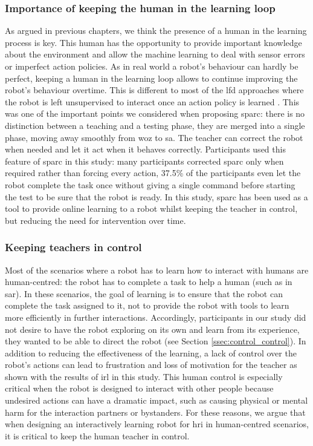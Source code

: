\subsubsection{Importance of keeping the human in the learning loop}

As argued in previous chapters, we think the presence of a human in the learning process is key. This human has the opportunity to provide important knowledge about the environment and allow the machine learning to deal with sensor errors or imperfect action policies. As in real world a robot's behaviour can hardly be perfect, keeping a human in the learning loop allows to continue improving the robot's behaviour overtime. This is different to most of the \gls{lfd} approaches where the robot is left unsupervised to interact once an action policy is learned \citep{argall2009survey,sequeira2016discovering}. This was one of the important points we considered when proposing \gls{sparc}: there is no distinction between a teaching and a testing phase, they are merged into a single phase, moving away smoothly from \gls{woz} to \gls{sa}. The teacher can correct the robot when needed and let it act when it behaves correctly. Participants used this feature of \gls{sparc} in this study: many participants corrected \gls{sparc} only when required rather than forcing every action, 37.5\% of the participants even let the robot complete the task once without giving a single command before starting the test to be sure that the robot is ready. In this study, \gls{sparc} has been used as a tool to provide online learning to a robot whilst keeping the teacher in control, but reducing the need for intervention over time.

\subsubsection{Keeping teachers in control}

Most of the scenarios where a robot has to learn how to interact with humans are human-centred: the robot has to complete a task to help a human (such as in \gls{sar}). In these scenarios, the goal of learning is to ensure that the robot can complete the task assigned to it, not to provide the robot with tools to learn more efficiently in further interactions. Accordingly, participants in our study did not desire to have the robot exploring on its own and learn from its experience, they wanted to be able to direct the robot (see Section \ref{ssec:control_control}). In addition to reducing the effectiveness of the learning, a lack of control over the robot's actions can lead to frustration and loss of motivation for the teacher as shown with the results of \gls{irl} in this study. This human control is especially critical when the robot is designed to interact with other people because undesired actions can have a dramatic impact, such as causing physical or mental harm for the interaction partners or bystanders. For these reasons, we argue that when designing an interactively learning robot for \gls{hri} in human-centred scenarios, it is critical to keep the human teacher in control. 

